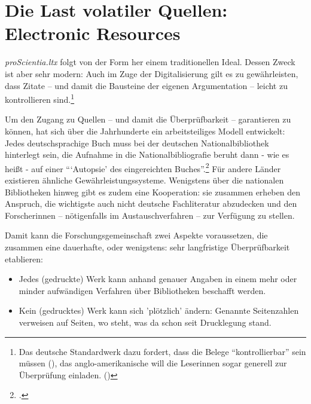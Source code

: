 
\appendix
\section{Die Last volatiler Quellen: Electronic Resources}

\emph{proScientia.ltx} folgt von der Form her einem traditionellen Ideal. Dessen Zweck ist aber sehr modern: Auch im Zuge der Digitalisierung gilt es zu gewährleisten, dass Zitate -- und damit die Bausteine der eigenen Argumentation -- leicht zu kontrollieren sind.\footnote{Das deutsche Standardwerk dazu fordert, dass die Belege \enquote{kontrollierbar} sein müssen (\cite[vgl.][160]{Theisen2013a}), das anglo-amerikanische will die Leserinnen sogar generell zur Überprüfung einladen. (\cite[vgl.][52]{ModLanAss2009a})}

Um den Zugang zu Quellen -- und damit die Überprüfbarkeit -- garantieren zu können, hat sich über die Jahrhunderte ein arbeitsteiliges Modell entwickelt: Jedes deutschsprachige Buch muss bei der deutschen Nationalbibliothek hinterlegt sein, die Aufnahme in die Nationalbibliografie beruht dann - wie es heißt - auf einer \enquote{\enquote{Autopsie} des eingereichten Buches}.\footcite[vgl.][68]{Theisen2013a} Für andere Länder existieren ähnliche Gewährleistungssysteme. Wenigstens über die nationalen Bibliotheken hinweg gibt es zudem eine Kooperation: sie zusammen erheben den Anspruch, die wichtigste auch nicht deutsche Fachliteratur abzudecken und den Forscherinnen -- nötigenfalls im Austauschverfahren -- zur Verfügung zu stellen.

Damit kann die Forschungsgemeinschaft zwei Aspekte voraussetzen, die zusammen eine dauerhafte, oder wenigstens: sehr langfristige Überprüfbarkeit etablieren:

\begin{itemize}
  \item Jedes (gedruckte) Werk kann anhand genauer Angaben in einem mehr oder minder aufwändigen Verfahren über Bibliotheken beschafft werden.
  \item  Kein (gedrucktes) Werk kann sich 'plötzlich' ändern: Genannte Seitenzahlen verweisen auf Seiten, wo steht, was da schon seit Drucklegung stand.
\end{itemize}

